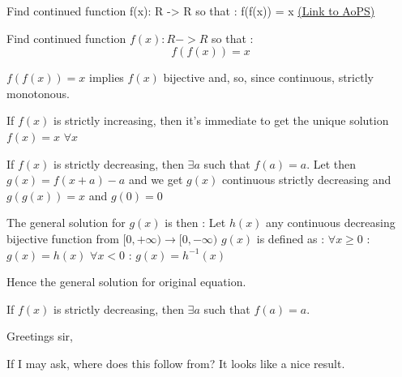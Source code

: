 \begin{problem}
	Find continued function f(x): R -> R  so that :
f(f(x)) = x
	\flushright \href{https://artofproblemsolving.com/community/c6h579786}{(Link to AoPS)}
\end{problem}



\begin{solution}
	\begin{tcolorbox}Find continued function $f(x): R -> R$  so that :
\[f(f(x)) = x\]\end{tcolorbox}
$f(f(x))=x$ implies $f(x)$ bijective and, so, since continuous, strictly monotonous.

If $f(x)$ is strictly increasing, then it's immediate to get the unique solution $f(x)=x$ $\forall x$

If $f(x)$ is strictly decreasing, then $\exists a$ such that $f(a)=a$.
Let then $g(x)=f(x+a)-a$ and we get $g(x)$ continuous strictly decreasing and $g(g(x))=x$ and $g(0)=0$

The general solution for $g(x)$ is then :
Let $h(x)$ any continuous decreasing bijective function from $[0,+\infty)\to[0,-\infty)$
$g(x)$ is defined as :
$\forall x\ge 0$ : $g(x)=h(x)$
$\forall x<0$ : $g(x)=h^{-1}(x)$

Hence the general solution for original equation.
\end{solution}



\begin{solution}
	\begin{tcolorbox}
If $f(x)$ is strictly decreasing, then $\exists a$ such that $f(a)=a$.
\end{tcolorbox}

Greetings sir,

If I may ask, where does this follow from? It looks like a nice result.
\end{solution}



